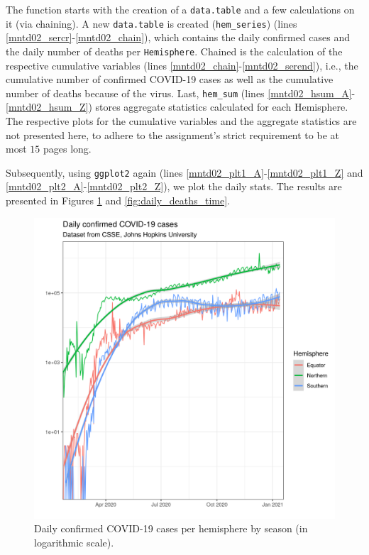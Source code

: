 The function starts with the creation of a \texttt{data.table} and a few calculations on it (via chaining).
A new \texttt{data.table} is created (\texttt{hem\_series}) (lines \ref{mntd02_sercr}-\ref{mntd02_chain}), which contains the daily confirmed cases and the daily number of deaths per \texttt{Hemisphere}.
Chained is the calculation of the respective cumulative variables (lines \ref{mntd02_chain}-\ref{mntd02_serend}), i.e., the cumulative number of confirmed COVID-19 cases as well as the cumulative number of deaths because of the virus.
Last, \texttt{hem\_sum} (lines \ref{mntd02_hsum_A}-\ref{mntd02_hsum_Z}) stores aggregate statistics calculated for each Hemisphere.
The respective plots for the cumulative variables and the aggregate statistics are not presented here, to adhere to the assignment's strict requirement to be at most $15$ pages long.

Subsequently, using \texttt{ggplot2} again (lines \ref{mntd02_plt1_A}-\ref{mntd02_plt1_Z} and \ref{mntd02_plt2_A}-\ref{mntd02_plt2_Z}), we plot the daily stats.
The results are presented in Figures \ref{fig:daily_cases_time} and \ref{fig:daily_deaths_time}.

\begin{figure}[H]
\centering
\includegraphics[scale=0.7]{images/hem_series_daily_cases.png}
\caption{Daily confirmed COVID-19 cases per hemisphere by season (in logarithmic scale).}
\label{fig:daily_cases_time}
\end{figure}

